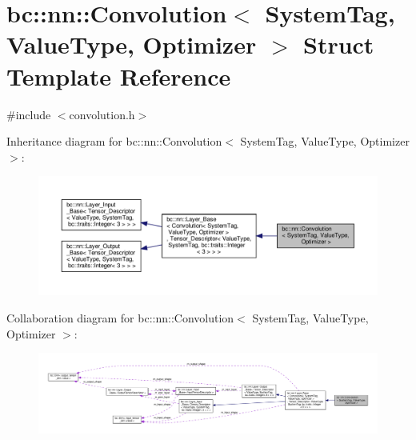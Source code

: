 \hypertarget{structbc_1_1nn_1_1Convolution}{}\section{bc\+:\+:nn\+:\+:Convolution$<$ System\+Tag, Value\+Type, Optimizer $>$ Struct Template Reference}
\label{structbc_1_1nn_1_1Convolution}


{\ttfamily \#include $<$convolution.\+h$>$}



Inheritance diagram for bc\+:\+:nn\+:\+:Convolution$<$ System\+Tag, Value\+Type, Optimizer $>$\+:\nopagebreak
\begin{figure}[H]
\begin{center}
\leavevmode
\includegraphics[width=350pt]{structbc_1_1nn_1_1Convolution__inherit__graph}
\end{center}
\end{figure}


Collaboration diagram for bc\+:\+:nn\+:\+:Convolution$<$ System\+Tag, Value\+Type, Optimizer $>$\+:\nopagebreak
\begin{figure}[H]
\begin{center}
\leavevmode
\includegraphics[width=350pt]{structbc_1_1nn_1_1Convolution__coll__graph}
\end{center}
\end{figure}
